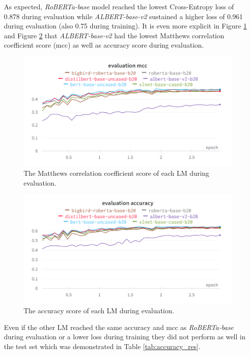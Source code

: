 \documentclass[10pt, english]{report}
\begin{document}
As expected, \textit{RoBERTa-base} model reached the lowest Cross-Entropy loss of 0.878 during evaluation while \textit{ALBERT-base-v2} sustained a higher loss of 0.961 during evaluation (also 0.75 during training). It is even more explicit in Figure \ref{fig:eval_mcc} and Figure \ref{fig:eval_acc} that \textit{ALBERT-base-v2} had the lowest Matthews correlation coefficient score (mcc) as well as accuracy score during evaluation.

\begin{figure}[htp]
    \centering
    \includegraphics[scale=0.2]{img/eval_mcc.png}
    \caption[Comparison]{The Matthews correlation coefficient score of each LM during evaluation.}
    \label{fig:eval_mcc}
\end{figure}

\begin{figure}[htp]
    \centering
    \includegraphics[scale=0.2]{img/eval_acc.png}
    \caption[Comparison]{The accuracy score of each LM during evaluation.}
    \label{fig:eval_acc}
\end{figure}

Even if the other LM reached the same accuracy and mcc as \textit{RoBERTa-base} during evaluation or a lower loss during training they did not perform as well in the test set which was demonstrated in Table \ref{tab:accuracy_res}.\\
\end{document}
